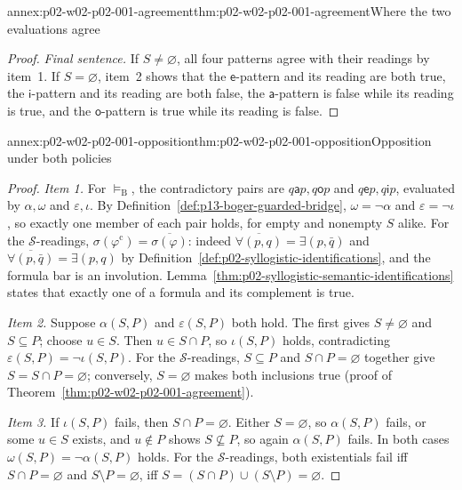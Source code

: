 \begin{annexitem}{annex:p02-w02-p02-001-agreement}{thm:p02-w02-p02-001-agreement}{Where the two evaluations agree}
\begin{proof}
\emph{Final sentence.} If \(S\ne\varnothing\), all four patterns agree with
their readings by item~1. If \(S=\varnothing\), item~2 shows that the
\(\mathsf e\)-pattern and its reading are both true, the
\(\mathsf i\)-pattern and its reading are both false, the
\(\mathsf a\)-pattern is false while its reading is true, and the
\(\mathsf o\)-pattern is true while its reading is false.
\end{proof}
\end{annexitem}

\begin{annexitem}{annex:p02-w02-p02-001-opposition}{thm:p02-w02-p02-001-opposition}{Opposition under both policies}
\begin{proof}
\emph{Item 1.} For \(\models_{\mathrm B}\), the contradictory pairs are
\(q\mathbin{\mathsf a}p,q\mathbin{\mathsf o}p\) and
\(q\mathbin{\mathsf e}p,q\mathbin{\mathsf i}p\), evaluated by \(\alpha,\omega\)
and \(\varepsilon,\iota\). By Definition~\ref{def:p13-boger-guarded-bridge},
\(\omega=\neg\alpha\) and \(\varepsilon=\neg\iota\), so exactly one member of
each pair holds, for empty and nonempty \(S\) alike. For the
\(\mathcal S\)-readings, \(\sigma(\varphi^{\mathrm c})=\overline{\sigma(\varphi)}\):
indeed \(\overline{\forall(p,q)}=\exists(p,\bar q)\) and
\(\overline{\forall(p,\bar q)}=\exists(p,q)\) by
Definition~\ref{def:p02-syllogistic-identifications}, and the formula bar is
an involution. Lemma~\ref{thm:p02-syllogistic-semantic-identifications}
states that exactly one of a formula and its complement is true.

\emph{Item 2.} Suppose \(\alpha(S,P)\) and \(\varepsilon(S,P)\) both hold.
The first gives \(S\ne\varnothing\) and \(S\subseteq P\); choose \(u\in S\).
Then \(u\in S\cap P\), so \(\iota(S,P)\) holds, contradicting
\(\varepsilon(S,P)=\neg\iota(S,P)\). For the \(\mathcal S\)-readings,
\(S\subseteq P\) and \(S\cap P=\varnothing\) together give
\(S=S\cap P=\varnothing\); conversely, \(S=\varnothing\) makes both
inclusions true (proof of Theorem~\ref{thm:p02-w02-p02-001-agreement}).

\emph{Item 3.} If \(\iota(S,P)\) fails, then \(S\cap P=\varnothing\). Either
\(S=\varnothing\), so \(\alpha(S,P)\) fails, or some \(u\in S\) exists, and
\(u\notin P\) shows \(S\not\subseteq P\), so again \(\alpha(S,P)\) fails.
In both cases \(\omega(S,P)=\neg\alpha(S,P)\) holds. For the
\(\mathcal S\)-readings, both existentials fail iff \(S\cap P=\varnothing\)
and \(S\setminus P=\varnothing\), iff \(S=(S\cap P)\cup(S\setminus P)=\varnothing\).


\end{proof}
\end{annexitem}
